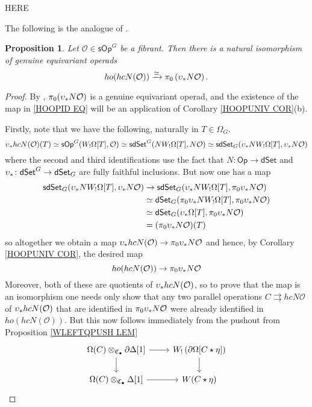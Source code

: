 \documentclass[a4paper,10pt
,draft
]{article}%
\numberwithin{equation}{section}
\numberwithin{figure}{section}
\newtheorem{proposition}[equation]{Proposition}%
\theoremstyle{definition} %
\newcommand{\dSet}{\mathsf{dSet}}
\renewcommand{\O}{\ensuremath{\mathcal O}}
\newcommand{\1}{\ensuremath{\mathbbm 1}}%
\begin{document}
{\color{red} HERE}

The following is the analogue of \cite[Prop. 4.8]{CM13b}.

\begin{proposition}
      \label{HOOPID_PROP}
Let $\mathcal{O} \in \mathsf{sOp}^G$
be a fibrant. 
Then there is a natural isomorphism of genuine equivariant operads
\begin{equation}\label{HOOPID EQ}
ho(hcN(\mathcal{O})) \xrightarrow{\simeq}
\pi_0 \left( \upsilon_{\**} N\mathcal{O} \right).
\end{equation}
\end{proposition}


\begin{proof}
      By \cite[Prop. 5.9]{BP_edss}, $\pi_0(\upsilon_{\**}N\O)$ is a genuine equivariant operad,
      and the existence of the map in \eqref{HOOPID EQ}
      will be an application of
      Corollary \ref{HOOPUNIV COR}(b).

Firstly,
note that we have the following, naturally in $T \in \Omega_G$.
\[
\upsilon_{\**}hcN(\O)(T)
\simeq
\mathsf{sOp}^G(W_!\Omega[T],\O)
\simeq
\mathsf{sdSet}^G(N W_!\Omega[T],N \O)
\simeq 
\mathsf{sdSet}_G(\upsilon_{\**}N W_!\Omega[T],\upsilon_{\**}N \O)
\]
where the second and third identifications use the fact that 
$N\colon \mathsf{Op} \to \mathsf{dSet}$ and $\upsilon_{\**} \colon \dSet^G \to \dSet_G$
are fully faithful inclusions. 
But now one has a map
\begin{align*}
  \mathsf{sdSet}_G(\upsilon_{\**}N W_!\Omega[T],\upsilon_{\**}N \O)
  & \to
    \mathsf{sdSet}_G(\upsilon_{\**}N W_!\Omega[T],\pi_0\upsilon_{\**}N \O)
  \\ & \simeq
       \mathsf{dSet}_G(\pi_0 \upsilon_{\**}  N W_!\Omega[T],\pi_0\upsilon_{\**}N \O)
  \\ & \simeq
       \mathsf{dSet}_G(\upsilon_{\**}\Omega[T],\pi_0\upsilon_{\**}N \O)
  \\ & =
       (\pi_0\upsilon_{\**}N \O)(T)
\end{align*}
so altogether we obtain a map
$\upsilon_{\**}hcN(\O) \to \pi_0 \upsilon_{\**} N \O$
and hence, by Corollary \ref{HOOPUNIV COR},
the desired map 
\[ho(hcN(\O)) \to \pi_0 \upsilon_{\**} N \O\]
Moreover, both of these are quotients of $\upsilon_{\**}hcN(\O)$,
so to prove that the map is an isomorphism one needs only show that any two parallel operations $C \rightrightarrows hcN \O$ of $\upsilon_{\**}hcN(\O)$
that are identified in 
$\pi_0 \upsilon_{\**} N \O$
were already identified in 
$ho(hcN(\O))$.
But this now follows immediately from the pushout from Proposition \ref{WLEFTQPUSH LEM}
\[
\begin{tikzcd}
	\Omega(C) \otimes_{\mathfrak{C}_{\bullet}}
	\partial \Delta[1]
	\ar{r} \ar{d}
&
	W_! \left(\partial \Omega[C \star \eta]\right) 
	\ar{d}
\\
	\Omega(C) \otimes_{\mathfrak{C}_{\bullet}}
	\Delta[1]
	\ar{r}
&
	W(C \star \eta)
\end{tikzcd}
\]
\end{proof}
\end{document}
